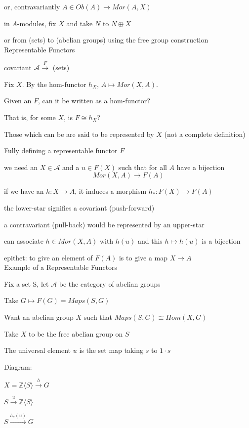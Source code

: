 \documentclass[12pt]{article}
\begin{document}
or, contravariantly $A \in Ob(A) \to Mor(A, X)$

in $A$-modules, fix $X$ and take $N$ to $N \oplus X$

or from (sets) to (abelian groups) using the free group construction\\

\noindent
Representable Functors

covariant $\mathcal{A} \xrightarrow{F}$ (sets)

Fix $X$.  By the hom-functor $h_X$, $A \mapsto Mor(X, A)$.

Given an $F$, can it be written as a hom-functor?

That is, for some $X$, is $F \cong h_X$?

Those which can be are said to be represented by $X$ (not a complete definition)

\noindent
Fully defining a representable functor $F$

we need an $X \in \mathcal{A}$ and a $u \in F(X)$ such that for all $A$ have a bijection $$Mor(X, A) \to F(A)$$

if we have an $h: X \to A$, it induces a morphism $h_*: F(X) \to F(A)$

the lower-star signifies a covariant (push-forward)

a contravariant (pull-back) would be represented by an upper-star

can associate $h \in Mor(X, A)$ with $h(u)$ and this $h \mapsto h(u)$ is a bijection

epithet: to give an element of $F(A)$ is to give a map $X \to A$\\

\noindent
Example of a Representable Functors

Fix a set S, let $\mathcal{A}$ be the category of abelian groups

Take $G \mapsto F(G) = Maps(S, G)$

Want an abelian group $X$ such that $Maps(S, G) \cong Hom(X, G)$

Take $X$ to be the free abelian group on $S$

The universal element $u$ is the set map taking $s$ to $1 \cdot s$

\noindent
Diagram:

$X = \mathds{Z}\langle S \rangle \xrightarrow{h} G$

$S \xrightarrow{u} \mathds{Z}\langle S \rangle$

$S \xrightarrow{h_*(u)} G$
\end{document}
